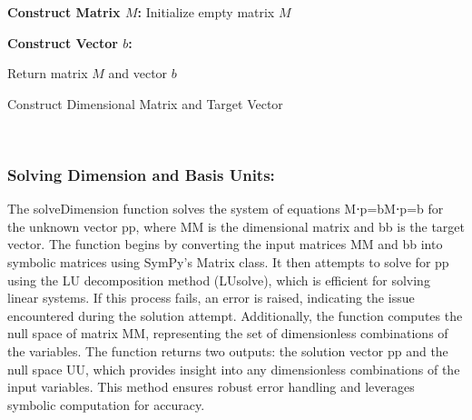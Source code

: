 \documentclass{article}
\begin{document}
\begin{algorithm}[H]
\SetAlgoLined
{}

\textbf{Construct Matrix \(M\):}\;
Initialize empty matrix \(M\)\;

\textbf{Construct Vector \(b\):}\;

Return matrix \(M\) and vector \(b\)\;

\caption{Construct Dimensional Matrix and Target Vector}
\label{alg:get_matrix_target} %
\end{algorithm}\\






\subsubsection{Solving Dimension and Basis Units:}


The solveDimension function solves the system of equations M⋅p=bM⋅p=b for the unknown vector pp, where MM is the dimensional matrix and bb is the target vector. The function begins by converting the input matrices MM and bb into symbolic matrices using SymPy's Matrix class. It then attempts to solve for pp using the LU decomposition method (LUsolve), which is efficient for solving linear systems. If this process fails, an error is raised, indicating the issue encountered during the solution attempt. Additionally, the function computes the null space of matrix MM, representing the set of dimensionless combinations of the variables. The function returns two outputs: the solution vector pp and the null space UU, which provides insight into any dimensionless combinations of the input variables. This method ensures robust error handling and leverages symbolic computation for accuracy.\\
\end{document}
